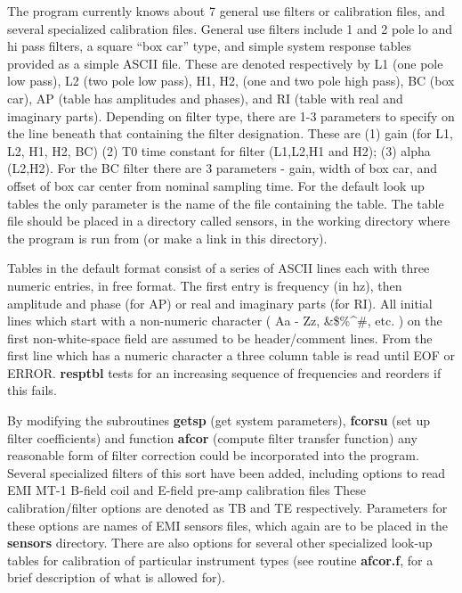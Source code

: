 The program currently knows about 7 general use filters or
calibration files, 
and several specialized calibration files.
General use filters include
1 and 2 pole lo and hi pass filters, a square ``box car'' type,
and simple system response tables provided as a simple ASCII file.
These are denoted respectively by L1 (one pole low pass),
L2 (two pole low pass), H1, H2, (one and two pole high pass),
BC (box car), AP (table has amplitudes and phases), and
RI (table with real and imaginary parts).
Depending on filter type, there are 1-3 parameters to specify
on the line beneath that containing the filter designation.
These are (1) gain (for L1, L2, H1, H2, BC) (2) T0 time constant for
filter (L1,L2,H1 and H2); (3) alpha (L2,H2).
For the BC filter there are 3 parameters - gain,
width of box car, and offset of box car center from nominal
sampling time.  For the default look up tables the only parameter is the
name of the file containing the table.  The table file should
be placed in a directory called sensors, in the working directory
where the program is run from (or make a link in this directory).

Tables in the default
format consist of a series of ASCII lines each with three numeric
entries, in free format.  The first entry is frequency (in hz),
then amplitude and phase (for AP) or real and imaginary parts 
(for RI).  All initial lines which start with a 
non-numeric character ( Aa - Zz, \&\*\$\%\^\@\#, etc. ) on the first
non-white-space    
field are assumed to be header/comment lines.
From the first line which has a numeric character a three
column table is read until EOF or ERROR. {\bf resptbl} tests for
an increasing sequence of frequencies and reorders if this fails.

By modifying the subroutines {\bf getsp} (get system parameters),
{\bf fcorsu} (set up filter coefficients) and function {\bf afcor}
(compute filter transfer function) any reasonable form of filter
correction could be incorporated into the program.
Several specialized filters of this sort have been added,
including options to read 
EMI MT-1 B-field coil and E-field pre-amp calibration files
These calibration/filter options are denoted as TB and TE respectively.
Parameters for these options are names of EMI sensors files, which
again are to be placed in the {\bf sensors} directory.
There are also options for several other specialized look-up tables for
calibration of particular instrument types (see routine {\bf afcor.f},
for a brief description of what is allowed for).

